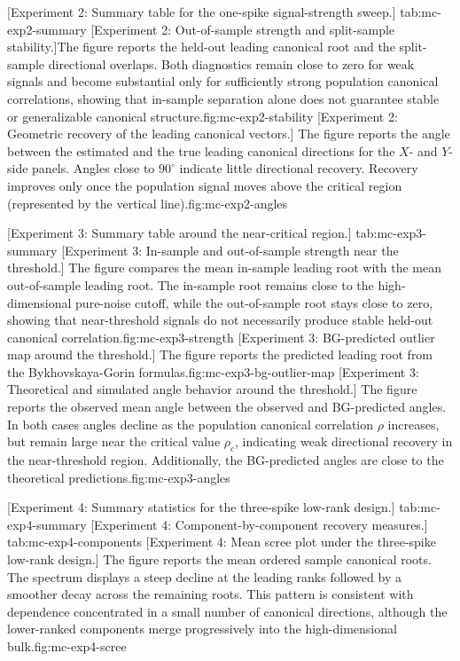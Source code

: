 \documentclass[12pt]{report} %
\begin{document}
[Experiment 2: Summary table for the one-spike signal-strength 
sweep.]{ }{tab:mc-exp2-summary}
[Experiment 2: Out-of-sample strength and split-sample stability.]{The figure reports the held-out leading canonical root and the split-sample directional overlaps. Both diagnostics remain close to zero for weak signals and become substantial only for sufficiently strong population canonical correlations, showing that in-sample separation alone does not guarantee stable or generalizable canonical structure.}{fig:mc-exp2-stability}
[Experiment 2: Geometric recovery of the leading canonical vectors.]{
The figure reports the angle between the estimated and the true leading canonical directions for the \(X\)- and \(Y\)-side panels. 
Angles close to \(90^\circ\) indicate little directional recovery. Recovery improves only once the population signal moves 
above the critical region (represented by the vertical line).}{fig:mc-exp2-angles}

[Experiment 3: Summary table around the near-critical region.]{ }{tab:mc-exp3-summary}
[Experiment 3: In-sample and out-of-sample strength near the threshold.]{
The figure compares the mean in-sample leading root with the mean out-of-sample leading root. 
The in-sample root remains close to the high-dimensional pure-noise cutoff, while the out-of-sample root 
stays close to zero, showing that near-threshold signals do not necessarily produce stable 
held-out canonical correlation.}{fig:mc-exp3-strength}
[Experiment 3: BG-predicted outlier map around the threshold.]{
The figure reports the predicted leading root from the Bykhovskaya-Gorin formulas.}{fig:mc-exp3-bg-outlier-map}
[Experiment 3: Theoretical and simulated angle behavior around the threshold.]{
The figure reports the observed mean angle between the observed and BG-predicted angles. In both cases
angles decline as the population canonical correlation \(\rho\) increases, but remain large near the critical 
value \(\rho_c\), indicating weak directional recovery in the near-threshold region. Additionally, 
the BG-predicted angles are close to the theoretical predictions.}{fig:mc-exp3-angles}

[Experiment 4: Summary statistics for the three-spike low-rank design.]{ }{tab:mc-exp4-summary}
[Experiment 4: Component-by-component recovery measures.]{ }{tab:mc-exp4-components}
[Experiment 4: Mean scree plot under the three-spike low-rank design.]{
The figure reports the mean ordered sample canonical roots. The spectrum displays a steep decline 
at the leading ranks followed by a smoother decay across the remaining roots. This pattern is 
consistent with dependence concentrated in a small number of canonical directions, although the 
lower-ranked components merge progressively into the high-dimensional bulk.}{fig:mc-exp4-scree}
\end{document}
